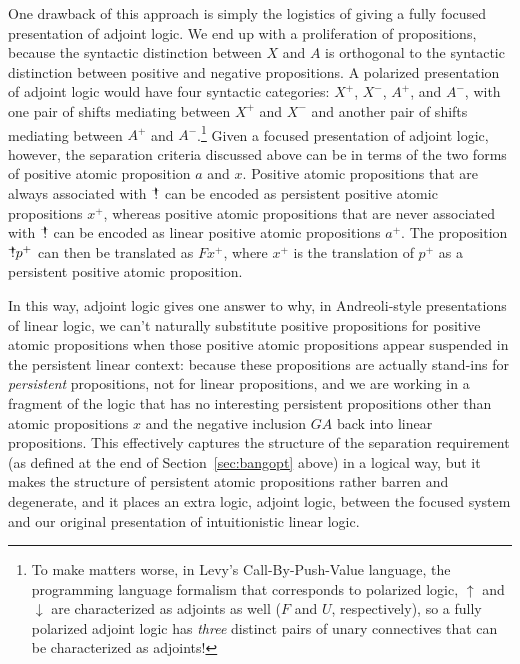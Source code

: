 One drawback of this approach is simply the logistics of giving 
a fully focused presentation
of adjoint logic. We end up with a proliferation of propositions,
because the syntactic distinction between $X$ and $A$ is orthogonal to
the syntactic distinction between positive and negative
propositions. A polarized presentation of adjoint logic would have
four syntactic categories: $X^+$, $X^-$, $A^+$, and $A^-$, with one
pair of shifts mediating between $X^+$ and $X^-$ and another pair of
shifts mediating between $A^+$ and $A^-$.\footnote{To make matters
  worse, in Levy's Call-By-Push-Value language, the programming
  language formalism that corresponds to polarized logic, ${\uparrow}$
  and ${\downarrow}$ are characterized as adjoints as well ($F$ and
  $U$, respectively), so a fully polarized adjoint logic has {\it
    three} distinct pairs of unary connectives that can be
  characterized as adjoints!}
Given a focused presentation of adjoint logic, however, 
the separation criteria discussed above can be
in terms of the two forms of positive atomic proposition $a$ and $x$. 
Positive atomic propositions that are always associated with
${\mbox{\hspace{2pt}$\mathbb !$\hspace{-5pt}$^+$\hspace{-1pt}}}$ can be encoded as persistent positive atomic
propositions $x^+$, whereas positive atomic propositions that are never
associated with ${\mbox{\hspace{2pt}$\mathbb !$\hspace{-5pt}$^+$\hspace{-1pt}}}$ can be encoded as linear positive atomic
propositions $a^+$. The proposition ${\mbox{\hspace{2pt}$\mathbb !$\hspace{-5pt}$^+$\hspace{-1pt}}}p^+$ can then be
translated as $F x^+$, where $x^+$ is the translation of $p^+$ as a
persistent positive atomic proposition.

In this way, adjoint logic gives one answer to why, in Andreoli-style
presentations of linear logic, we can't naturally substitute positive
propositions for positive atomic propositions when those positive
atomic propositions appear suspended in the persistent linear context:
because these propositions are actually stand-ins for {\it persistent}
propositions, not for linear propositions, and we are working in a
fragment of the logic that has no interesting persistent propositions
other than atomic propositions $x$ and the negative inclusion $G A$
back into linear propositions.  This effectively captures the
structure of the separation requirement (as defined at the end of
Section~\ref{sec:bangopt} above) in a logical way, but it makes the
structure of persistent atomic propositions rather barren and
degenerate, and it places an extra logic, adjoint logic, between the
focused system and our original presentation of intuitionistic linear
logic.

